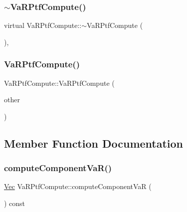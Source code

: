 \hypertarget{classVaRPtfCompute_ae148a8c1e965084669cbfec4442b57d5}{}\label{classVaRPtfCompute_ae148a8c1e965084669cbfec4442b57d5} 
\subsubsection{\texorpdfstring{$\sim$\+Va\+R\+Ptf\+Compute()}{~VaRPtfCompute()}}
{\footnotesize\ttfamily virtual Va\+R\+Ptf\+Compute\+::$\sim$\+Va\+R\+Ptf\+Compute (\begin{DoxyParamCaption}{ }\end{DoxyParamCaption})\hspace{0.3cm}{\ttfamily [inline]}, {\ttfamily [virtual]}}

\hypertarget{classVaRPtfCompute_ab2ed8e78a76598f0d3aae10d94e93c1b}{}\label{classVaRPtfCompute_ab2ed8e78a76598f0d3aae10d94e93c1b} 
\subsubsection{\texorpdfstring{Va\+R\+Ptf\+Compute()}{VaRPtfCompute()}\hspace{0.1cm}{\footnotesize\ttfamily [2/2]}}
{\footnotesize\ttfamily Va\+R\+Ptf\+Compute\+::\+Va\+R\+Ptf\+Compute (\begin{DoxyParamCaption}\item[{const \hyperlink{classVaRPtfCompute}{Va\+R\+Ptf\+Compute} \&}]{other }\end{DoxyParamCaption})}



\subsection{Member Function Documentation}
\hypertarget{classVaRPtfCompute_ae25fc1528e8902c7039574b6e6eef1f0}{}\label{classVaRPtfCompute_ae25fc1528e8902c7039574b6e6eef1f0} 
\subsubsection{\texorpdfstring{compute\+Component\+Va\+R()}{computeComponentVaR()}}
{\footnotesize\ttfamily \hyperlink{compute__returns__eigen_8h_a1eb6a9306ef406d7975f3cbf2e247777}{Vec} Va\+R\+Ptf\+Compute\+::compute\+Component\+VaR (\begin{DoxyParamCaption}{ }\end{DoxyParamCaption}) const}

